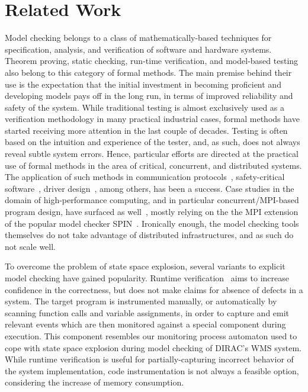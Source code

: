 \documentclass[sort&compress,preprint,3p]{elsarticle}
\begin{document}
\section{Related Work}
\label{sec:RelatedWork}
Model checking belongs to a class of mathematically-based techniques for specification, analysis,
and verification of software and hardware systems. Theorem proving, static checking, run-time verification, and model-based testing
also belong to this category of formal methods. The main premise behind their use is the expectation that
the initial investment in becoming proficient and developing models pays off in the long run, in terms 
of improved reliability and safety of the system. While traditional testing is almost
exclusively used as a verification methodology in many practical industrial cases,
formal methods have started receiving more attention in the last couple of decades. 
Testing is often based on the intuition and experience of the tester, and, as such, does not 
always reveal subtle system errors. Hence, particular efforts are directed at
the practical use of formal methods in the area of critical, concurrent, and distributed 
systems.
The application of such methods in communication protocols~\cite{SPIN_case_study,SlidingWindowProtocol,sessionMgmtMasterThesis}, 
safety-critical software~\cite{Java_PathFinder,CMS_LHC,Mathijssen:2006:VDA:1757571.1757584},
driver design~\cite{Ball04slamand,Linux_driver}, among others, has been a success.
Case studies in the domain of high-performance computing, and in particular concurrent/MPI-based program design,
have surfaced as well~\cite{Siegel04verificationof,Matlin:2002:SPS:645881.672236,Siegel:2007:MCN:1763048.1763053}, mostly 
relying on the the MPI extension of the popular model checker SPIN~\cite{Siegel:2007:VPP:2396095.2396105}.
Ironically enough, the model checking tools themselves do not take advantage of distributed infrastructures, and 
as such do not scale well. 

To overcome the problem of state space explosion, several
variants to explicit model checking have gained popularity. Runtime
verification~\cite{citeulike:10198274,Havelund:2008:RVC:1424465.1424470}
aims to increase confidence in the correctness, but does not make claims for
absence of defects in a system.
The target program is instrumented manually, or automatically by scanning
function calls and variable assignments, 
in order to capture and emit relevant events which are then monitored against a
special component during execution.
This component resembles our monitoring process automaton used to cope with
state space explosion during model checking 
of DIRAC's WMS system. While runtime verification is useful for
partially-capturing incorrect behavior of the system implementation, 
code instrumentation is not always a feasible option, considering the increase
of memory consumption. 
\end{document}
